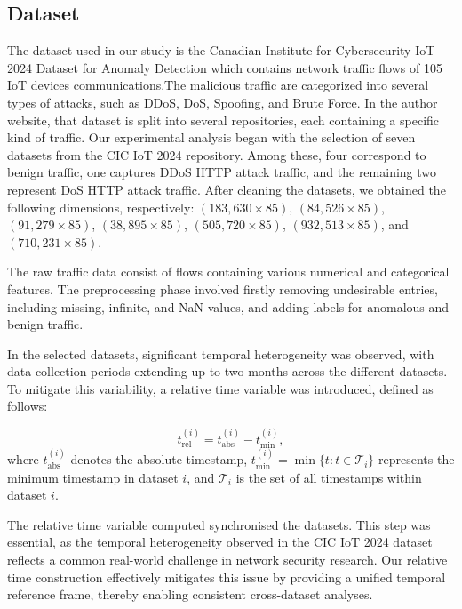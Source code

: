 \documentclass[preprint,12pt,authoryear]{elsarticle}
\begin{document}
\subsection{Dataset}
The dataset used in our study is the Canadian Institute for Cybersecurity IoT 2024 Dataset for Anomaly Detection \citep{rabbani2024iot-diad} which contains network traffic flows of 105 IoT devices communications.The malicious traffic are categorized into several types of attacks, such as DDoS, DoS, Spoofing, and Brute Force. In the author website, that dataset is split into several repositories, each containing a specific kind of traffic. Our experimental analysis began with the selection of seven datasets from the CIC IoT 2024 repository. Among these, four correspond to benign traffic, one captures DDoS HTTP attack traffic, and the remaining two represent DoS HTTP attack traffic. After cleaning the datasets, we obtained the following dimensions, respectively:
$(183,630 \times 85)$, $(84,526 \times 85)$, $(91,279 \times 85)$, $(38,895 \times 85)$, $(505,720 \times 85)$, $(932,513 \times 85)$, and $(710,231 \times 85)$.

The raw traffic data consist of flows containing various numerical and categorical features. The preprocessing phase involved firstly removing undesirable entries, including missing, infinite, and NaN values, and adding labels for anomalous and benign traffic.

In the selected datasets, significant temporal heterogeneity was observed, with data collection periods extending up to two months across the different datasets. To mitigate this variability, a relative time variable was introduced, defined as follows:

\begin{equation}
t_{\text{rel}}^{(i)} = t_{\text{abs}}^{(i)} - t_{\min}^{(i)},
\end{equation}
\noindent where $t_{\text{abs}}^{(i)}$ denotes the absolute timestamp, $t_{\min}^{(i)} = \min\{t : t \in \mathcal{T}_i\}$ represents the minimum timestamp in dataset $i$, and $\mathcal{T}_i$ is the set of all timestamps within dataset $i$. 

The relative time variable computed synchronised the datasets. This step was essential, as the temporal heterogeneity observed in the CIC IoT 2024 dataset reflects a common real-world challenge in network security research. Our relative time construction effectively mitigates this issue by providing a unified temporal reference frame, thereby enabling consistent cross-dataset analyses.
\end{document}
